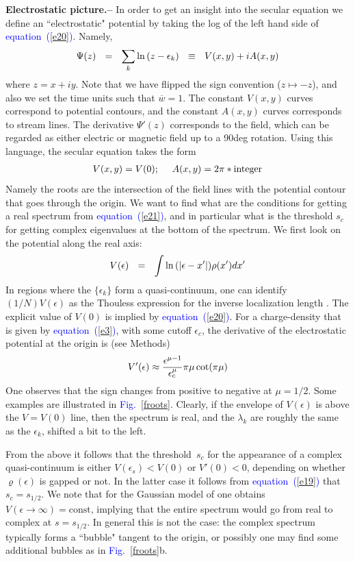 \documentclass[aps,pre,floats,floatfix,twocolumn]{revtex4}
\newcommand{\be}[1]{\begin{eqnarray}\ifthenelse{#1=-1}{\nonumber}{\ifthenelse{#1=0}{}{\label{e#1}}}}
\newcommand{\eeq}{\end{eqnarray}}
\newcommand{\Eq}[1]{\textcolor{blue}{{equation}\!~(\ref{#1})}}
\newcommand{\Fig}[1]{\textcolor{blue}{Fig.}\!\!~\ref{#1}}
\newcommand{\sect}[1]{{\bf #1.-- }}
\begin{document}
\sect{Electrostatic picture}
%
In order to get an insight into the secular equation we 
define an ``electrostatic" potential by taking the log 
of the left hand side of \Eq{e20}. Namely, 
%
\be{22}
\Psi(z) \ \ = \ \ \sum_k \ln\left(z-\epsilon_k\right) \ \ \equiv \ \ V(x,y)+iA(x,y)
\eeq
%
where ${z=x+iy}$. Note that we have flipped the sign convention (${z\mapsto -z}$), 
and also we set the time units such that $\overline{w}=1$.
% 
The constant ${V(x,y)}$ curves correspond to potential contours,
and the constant ${A(x,y)}$ curves corresponds 
to stream lines. The derivative $\Psi'(z)$ corresponds to the field, 
which can be regarded as either electric or magnetic field up to a 90deg rotation.       
Using this language, the secular equation takes the form
%
\be{21}
V(x,y)=V(0); \ \ \ \ A(x,y)=2\pi*\text{integer} 
\eeq
%
Namely the roots are the intersection of the field lines with the 
potential contour that goes through the origin. 
%
%
We want to find what are the conditions for getting 
a real spectrum from \Eq{e21}, and in particular what 
is the threshold $s_c$ for getting complex eigenvalues 
at the bottom of the spectrum. 
We first look on the potential along the real axis:
%
\be{23}
V(\epsilon) \ \ = \ \  \int \ln \left(|\epsilon-x' \right|) \rho(x')dx' 
\eeq
%
In regions where the $\{\epsilon_k\}$ form a quasi-continuum,  
one can identify $(1/N)V(\epsilon)$ as the Thouless expression  
for the inverse localization length \cite{Shnerb1}.
The explicit value of $V(0)$ is implied by \Eq{e20}.   
For a charge-density that is given by \Eq{e3}, with some cutoff $\epsilon_c$,
the derivative of the electrostatic potential at the origin is (see Methods)
%
\be{19}
V'(\epsilon) \approx  \frac{ \epsilon^{\mu-1}}{\epsilon_c^{\mu}} \pi \mu \cot(\pi \mu)
\eeq
%
One observes that the sign changes from positive to negative at $\mu=1/2$.
Some examples are illustrated in \Fig{froots}.
Clearly, if the envelope of $V(\epsilon)$ is above 
the $V=V(0)$ line, then the spectrum is real, and the $\lambda_k$ are roughly 
the same as the $\epsilon_k$, shifted a bit to the left. 


From the above it follows that the threshold~$s_c$ 
for the appearance of a complex quasi-continuum 
is either  ${V(\epsilon_s)<V(0)}$  or  ${V'(0)<0}$, 
depending on whether $\varrho(\epsilon)$ is gapped or not. 
In the latter case it follows from \Eq{e19} that ${s_c=s_{1/2}}$.
%
We note that for the Gaussian model of \cite{odh3}
one obtains ${V(\epsilon \rightarrow \infty) = \text{const}}$,  
implying that the entire spectrum would go from real to complex at $s=s_{1/2}$. 
In general this is not the case: the complex spectrum typically 
forms a ``bubble" tangent to the origin, or possibly 
one may find some additional bubbles as in \Fig{froots}b.   
\end{document}
